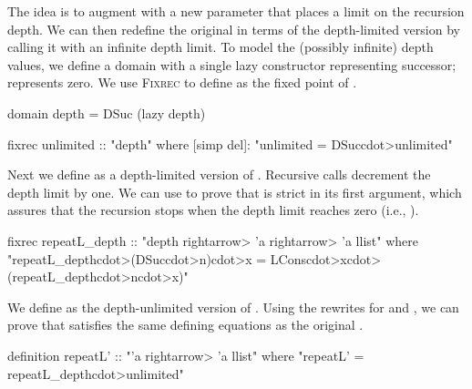 The idea is to augment  with a new parameter that places a limit on the recursion depth. We can then redefine the original  in terms of the depth-limited version by calling it with an infinite depth limit. To model the (possibly infinite) depth values, we define a domain  with a single lazy constructor  representing successor;  represents zero. We use \textsc{Fixrec} to define  as the fixed point of .
%
\begin{isacode}
domain depth = DSuc (lazy depth)
\end{isacode}
\unmedskip
{}
\begin{isacode}
fixrec unlimited :: "depth"
  where [simp del]: "unlimited = DSuc\<cdot>unlimited"
\end{isacode}
%
Next we define  as a depth-limited version of . Recursive calls decrement the depth limit by one. We can use  to prove that  is strict in its first argument, which assures that the recursion stops when the depth limit reaches zero (i.e., ).
%
\begin{isacode}
fixrec repeatL_depth :: "depth \<rightarrow> 'a \<rightarrow> 'a llist"
  where "repeatL_depth\<cdot>(DSuc\<cdot>n)\<cdot>x = LCons\<cdot>x\<cdot>(repeatL_depth\<cdot>n\<cdot>x)"
\end{isacode}
%
We define  as the depth-unlimited version of . Using the rewrites for  and , we can prove that  satisfies the same defining equations as the original .
%
\begin{isacode}
definition repeatL' :: "'a \<rightarrow> 'a llist"
  where "repeatL' = repeatL_depth\<cdot>unlimited"
\end{isacode}

